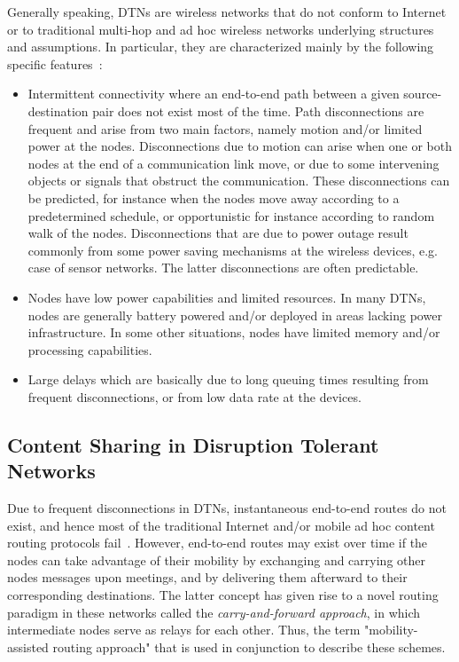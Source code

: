 Generally speaking, DTNs are wireless networks that do not conform to Internet or to traditional multi-hop and ad hoc wireless networks underlying structures and assumptions.
In particular, they are characterized mainly by the following specific features~\cite{fall03, DTNTutorial}:

\begin{itemize}
\item{Intermittent connectivity where an end-to-end path between a given source-destination pair does not exist most of the time. Path disconnections are frequent and arise from two main factors, namely motion and/or limited power at the nodes. Disconnections due to motion can arise when one or both nodes at the end of a communication link move, or due to some intervening objects or signals that obstruct the communication. These disconnections can be predicted, for instance when the nodes move away according to a predetermined schedule, or opportunistic for instance according to random walk of the nodes. Disconnections that are due to power outage result
commonly from some power saving mechanisms at the wireless devices, e.g. case of sensor networks. The latter disconnections are often predictable.}
\item{Nodes have low power capabilities and limited resources. In many DTNs, nodes are generally battery powered and/or deployed in areas lacking power infrastructure. In
some other situations, nodes have limited memory and/or processing capabilities.}
\item{Large delays which are basically due to long queuing times resulting from frequent disconnections, or from low data rate at the devices.}
\end{itemize}

\subsection{Content Sharing in Disruption Tolerant Networks}

Due to frequent disconnections in DTNs, instantaneous end-to-end routes do not exist, and hence most of the traditional Internet and/or mobile ad hoc content routing protocols fail~\cite{Fall:DTNrouting}. However, end-to-end routes may exist over time if the nodes can take advantage of their mobility by exchanging and carrying other nodes messages upon meetings, and by delivering them afterward to their corresponding destinations. The latter concept has given rise to a novel routing paradigm in these networks called the \emph{carry-and-forward approach}, in which intermediate nodes serve as relays for each other. Thus, the term "mobility-assisted routing approach" that is used in conjunction to describe these schemes.


